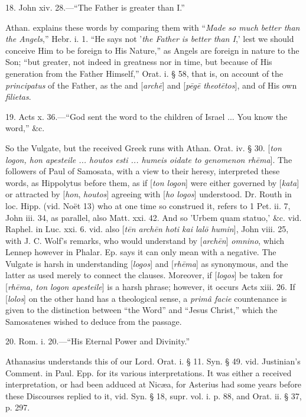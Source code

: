 18. John xiv. 28.—``The Father is greater than
I.''

Athan. explains these words by comparing them
with ``\emph{Made so much better than the Angels},'' Hebr. i. 1. ``He
says not '\emph{the Father is better than I},' lest we should conceive
Him to be foreign to His Nature,'' as Angels are foreign in nature to
the Son; ``but greater, not indeed in greatness nor in time, but
because of His generation from the Father Himself,'' Orat. i. § 58,
that is, on account of the \emph{principatus} of the Father, as the
and [\emph{arch\={e}}] and [\emph{p\={e}g\={e} theot\={e}tos}],
and of His own \emph{filietas}.

19. Acts x. 36.—``God sent the word to the
children of Israel ... You know the word,'' \&c.

So the Vulgate, but the received Greek runs with
Athan. Orat. iv. § 30. [\emph{ton logon, hon apesteile ... houtos esti
... humeis oidate to genomenon rh\={e}ma}]. The followers of
Paul of Samosata, with a view to their heresy, interpreted these
words, as Hippolytus before them, as if [\emph{ton logon}] were either
governed by [\emph{kata}] or attracted by [\emph{hon}, \emph{houtos}]
agreeing with [\emph{ho logos}] understood. Dr. Routh in loc. Hipp. (vid.
Noët 13) who at one time so construed it, refers to 1 Pet. ii. 7,
John iii. 34, as parallel, also Matt. xxi. 42. And so 'Urbem quam
statuo,' \&c. vid. Raphel. in Luc. xxi. 6. vid. also [\emph{t\={e}n
arch\={e}n hoti kai lal\={o} humin}], John viii. 25, with J.
C. Wolf's remarks, who would understand by [\emph{arch\={e}n}] \emph{omnino},
which Lennep however in Phalar. Ep. says it can only mean with a
negative. The Vulgate is harsh in understanding [\emph{logos}] and [\emph{rh\={e}ma}]
as synonymous, and the latter as used merely to connect the clauses.
Moreover, if [\emph{logos}] be taken for [\emph{rh\={e}ma, ton logon
apesteile}] is a harsh phrase; however, it occurs Acts xiii. 26. If
[\emph{lolos}] on the other hand has a theological sense, a \emph{primâ
facie} countenance is given to the distinction between ``the Word''
and ``Jesus Christ,'' which the Samosatenes wished to deduce from the
passage.

20. Rom. i. 20.—``His Eternal Power and
Divinity.''

Athanasius understands this of our Lord. Orat. i.
§ 11. Syn. § 49. vid. Justinian's Comment. in Paul. Epp. for
its various interpretations. It was either a received interpretation,
or had been adduced at Nicæa, for Asterius had some years before
these Discourses replied to it, vid. Syn. § 18, supr. vol. i. p. 88,
and Orat. ii. § 37, p. 297.

